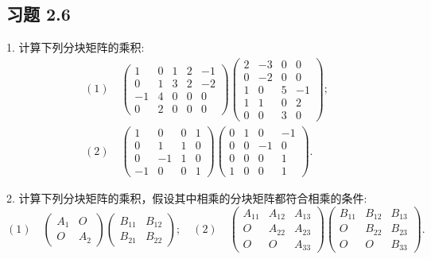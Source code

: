 \documentclass[UTF8,12pt,a4paper,fontset=fandol]{ctexart}
\begin{document}
\subsection*{习题 2.6}

1. 计算下列分块矩阵的乘积:
\[
\begin{array}{ll}
(1)\quad
\left(\begin{array}{cc|ccc}
1 & 0 & 1 & 2 & -1\\
0 & 1 & 3 & 2 & -2\\ \hline
-1 & 4 & 0 & 0 & 0\\
0 & 2 & 0 & 0 & 0
\end{array}\right)
\left(\begin{array}{cc|cc}
2 & -3 & 0 & 0\\
0 & -2 & 0 & 0\\ \hline
1 & 0 & 5 & -1\\
1 & 1 & 0 & 2\\
0 & 0 & 3 & 0
\end{array}\right);\\[3em]
(2)\quad
\left(\begin{array}{cc|cc}
1 & 0 & 0 & 1\\
0 & 1 & 1 & 0\\ \hline
0 & -1 & 1 & 0\\
-1 & 0 & 0 & 1
\end{array}\right)
\left(\begin{array}{cc|cc}
0 & 1 & 0 & -1\\
0 & 0 & -1 & 0\\ \hline
0 & 0 & 0 & 1\\
1 & 0 & 0 & 1
\end{array}\right).
\end{array}
\]

2. 计算下列分块矩阵的乘积，假设其中相乘的分块矩阵都符合相乘的条件:
\[
(1)\quad
\left(\begin{array}{cc}
A_1 & O\\
O & A_2
\end{array}\right)
\left(\begin{array}{cc}
B_{11} & B_{12}\\
B_{21} & B_{22}
\end{array}\right);
\quad
(2)\quad
\left(\begin{array}{ccc}
A_{11} & A_{12} & A_{13}\\
O & A_{22} & A_{23}\\
O & O & A_{33}
\end{array}\right)
\left(\begin{array}{ccc}
B_{11} & B_{12} & B_{13}\\
O & B_{22} & B_{23}\\
O & O & B_{33}
\end{array}\right).
\]
\end{document}
